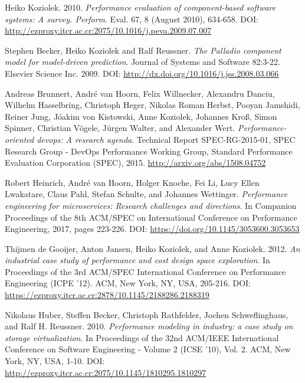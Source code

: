 \documentclass[11pt, twoside]{report}
\begin{document}

\begin{thebibliography}{9}

 Heiko Koziolek. 2010. \emph{Performance evaluation of component-based software systems: A survey. Perform}. Eval. 67, 8 (August 2010), 634-658. DOI: \url{http://ezproxy.itcr.ac.cr:2075/10.1016/j.peva.2009.07.007} 

 Stephen Becker, Heiko Koziolek and Ralf Reussner. \emph{The Palladio component model for model-driven prediction}. Journal of Systems and Software 82:3-22. Elsevier Science Inc. 2009. DOI: \url{http://dx.doi.org/10.1016/j.jss.2008.03.066}

 Andreas Brunnert, André van Hoorn, Felix Willnecker, Alexandru Danciu, Wilhelm Hasselbring, Christoph Heger, Nikolas Roman Herbst, Pooyan Jamshidi, Reiner Jung, Jóakim von Kistowski, Anne Koziolek, Johannes Kroß, Simon Spinner, Christian Vögele, Jürgen Walter, and Alexander Wert. \emph{Performance-oriented devops: A research agenda}. Technical Report SPEC-RG-2015-01, SPEC Research Group - DevOps Performance Working Group, Standard Performance Evaluation Corporation (SPEC), 2015. \url{http://arxiv.org/abs/1508.04752}

 Robert Heinrich, André van Hoorn, Holger Knoche, Fei Li, Lucy Ellen Lwakatare, Claus Pahl, Stefan Schulte, and Johannes Wettinger. \emph{Performance engineering for microservices: Research challenges and directions}. In Companion Proceedings of the 8th ACM/SPEC on International Conference on Performance Engineering, 2017, pages 223-226. DOI: \url{https://doi.org/10.1145/3053600.3053653}

 Thijmen de Gooijer, Anton Jansen, Heiko Koziolek, and Anne Koziolek. 2012. \emph{An industrial case study of performance and cost design space exploration}. In Proceedings of the 3rd ACM/SPEC International Conference on Performance Engineering (ICPE '12). ACM, New York, NY, USA, 205-216. DOI: \url{https://ezproxy.itcr.ac.cr:2878/10.1145/2188286.2188319}

 Nikolaus Huber, Steffen Becker, Christoph Rathfelder, Jochen Schweflinghaus, and Ralf H. Reussner. 2010. \emph{Performance modeling in industry: a case study on storage virtualization}. In Proceedings of the 32nd ACM/IEEE International Conference on Software Engineering - Volume 2 (ICSE '10), Vol. 2. ACM, New York, NY, USA, 1-10. DOI: \url{http://ezproxy.itcr.ac.cr:2075/10.1145/1810295.1810297} 


\end{thebibliography}
\end{document}
